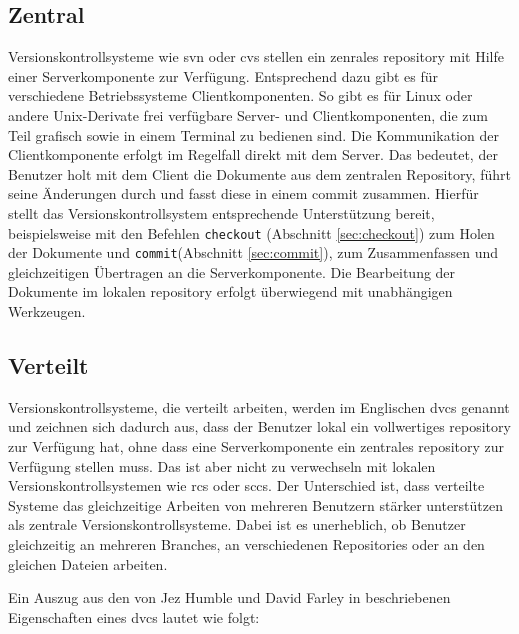 \subsection{Zentral}\label{sec:central}
Versionskontrollsysteme wie \acrshort{svn} oder \acrshort{cvs} stellen ein
zenrales \gls{repository} mit Hilfe einer Serverkomponente zur Verfügung.
Entsprechend dazu gibt es für verschiedene Betriebssysteme Clientkomponenten.
So gibt es für Linux oder andere Unix-Derivate frei verfügbare Server- und
Clientkomponenten, die zum Teil grafisch sowie in einem Terminal zu bedienen
sind. Die Kommunikation der Clientkomponente erfolgt im Regelfall direkt mit
dem Server. Das bedeutet, der Benutzer holt mit dem Client die Dokumente aus
dem zentralen Repository, führt seine Änderungen durch und fasst diese in einem
\gls{commit} zusammen. Hierfür stellt das Versionskontrollsystem entsprechende
Unterstützung bereit, beispielsweise mit den Befehlen \texttt{checkout}
(Abschnitt \ref{sec:checkout}) zum Holen der Dokumente und
\texttt{commit}(Abschnitt \ref{sec:commit}), zum Zusammenfassen und
gleichzeitigen Übertragen an die Serverkomponente. Die Bearbeitung der
Dokumente im lokalen \gls{repository} erfolgt überwiegend mit unabhängigen
Werkzeugen. \cite[S.~38-40]{hagen:1678}

\subsection{Verteilt}\label{sec:decentral}
Versionskontrollsysteme, die verteilt arbeiten, werden im Englischen
\acrfull{dvcs} genannt und zeichnen sich dadurch aus, dass der Benutzer lokal
ein vollwertiges \gls{repository} zur Verfügung hat, ohne dass eine
Serverkomponente ein zentrales \gls{repository} zur Verfügung stellen muss. Das
ist aber nicht zu verwechseln mit lokalen Versionskontrollsystemen wie
\acrshort{rcs} oder \acrshort{sccs}. Der Unterschied ist, dass verteilte
Systeme das gleichzeitige Arbeiten von mehreren Benutzern stärker unterstützen als
zentrale Versionskontrollsysteme. Dabei ist es unerheblich, ob Benutzer gleichzeitig
an mehreren Branches, an verschiedenen Repositories oder an den gleichen
Dateien arbeiten. \cite[S.~393-394]{cd}

Ein Auszug aus den von Jez Humble und David Farley in \cite[S.~393-394]{cd}
beschriebenen Eigenschaften eines \acrshort{dvcs} lautet wie folgt:

